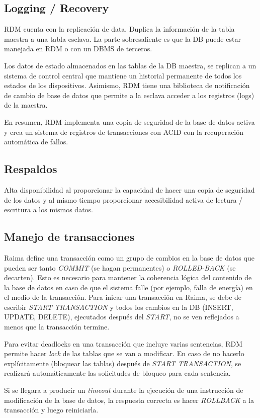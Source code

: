 \documentclass{acmart}
\begin{document}
\subsection{Logging / Recovery}
RDM cuenta con la replicación de data. Duplica la información de la tabla maestra a una tabla esclava. La parte sobresaliente es que la DB puede estar manejada en RDM o con un DBMS de terceros.

Los datos de estado almacenados en las tablas de la DB maestra, se replican a un sistema de control central que mantiene un historial permanente de todos los estados de los dispositivos. Asimismo, RDM tiene una biblioteca de notificación de cambio de base de datos que permite a la esclava acceder a los registros (logs) de la maestra.

En resumen, RDM implementa una copia de seguridad de la base de datos activa y crea un sistema de registros de transacciones con ACID con la recuperación automática de fallos. \cite{Rserv, Rwiki}
\subsection{Respaldos}
Alta disponibilidad al proporcionar la capacidad de hacer una copia de seguridad de los datos y al mismo tiempo proporcionar accesibilidad activa de lectura / escritura a los mismos datos. \cite{Rpdf2}
\subsection{Manejo de transacciones}
Raima define una transacción como un grupo de cambios en la base de datos que pueden ser tanto \textit{COMMIT} (se hagan permanentes) o \textit{ROLLED-BACK} (se decarten). Esto es necesario para mantener la coherencia lógica del contenido de la base de datos en caso de que el sistema falle (por ejemplo, falla de energía) en el medio de la transacción. Para inicar una transacción en Raima, se debe de escribir \textit{START TRANSACTION} y todos los cambios en la DB (INSERT, UPDATE, DELETE), ejecutados después del \textit{START}, no se ven reflejados a menos que la transacción termine. 

Para evitar \textbf{}{deadlocks} en una transacción que incluye varias sentencias, RDM permite hacer \textit{lock} de las tablas que se van a modificar. En caso de no hacerlo explícitamente (bloquear las tablas) después de \textit{START TRANSACTION}, se realizará automáticamente las solicitudes de bloqueo para cada sentencia. 

Si se llegara a producir un \textit{timeout} durante la ejecución de una instrucción de modificación de la base de datos, la respuesta correcta es hacer \textit{ROLLBACK}
a la transacción y luego reiniciarla. \cite{Rtrans}
\end{document}
